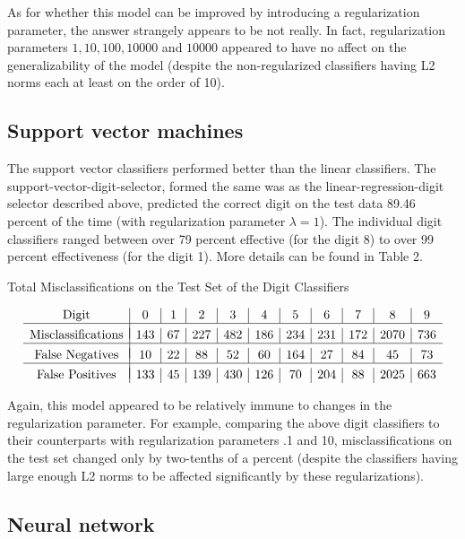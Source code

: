 \documentclass{article}
\begin{document}
As for whether this model can be improved by introducing a regularization parameter, the answer strangely appears to be not really. In fact, regularization parameters $1,10,100,10000$ and $10000$ appeared to have no affect on the generalizability of the model (despite the non-regularized classifiers having L2 norms each at least on the order of 10).

\subsection{Support vector machines}

The support vector classifiers performed better than the linear classifiers. The support-vector-digit-selector, formed the same was as the linear-regression-digit selector described above, predicted the correct digit on the test data 89.46 percent of the time (with regularization parameter $\lambda = 1$). The individual digit classifiers ranged between over 79 percent effective (for the digit 8) to over 99 percent effectiveness (for the digit 1). More details can be found in Table 2. \begin{table}
  \caption{Total Misclassifications on the Test Set of the Digit Classifiers}
  \label{sample-table}
  \centering
  $$\begin{array}{c|c|c|c|c|c|c|c|c|c|c} \mbox{Digit} & 0 & 1 & 2 & 3 &4 & 5 & 6 & 7 & 8 & 9  \\ \hline  \\[-.3cm]
\mbox{Misclassifications} & 143 & 67 & 227 & 482 & 186 & 234 & 231 & 172 & 2070 & 736  \\ \hline  \\[-.3cm]
\mbox{False Negatives} & 10 & 22 & 88 & 52 & 60 & 164 & 27 & 84 & 45 & 73  \\ \hline  \\[-.3cm]
\mbox{False Positives} & 133 & 45 & 139 & 430 & 126 & 70 & 204 & 88 & 2025 & 663 

\end{array}$$
\end{table}

Again, this model appeared to be relatively immune to changes in the regularization parameter. For example, comparing the above digit classifiers to their counterparts with regularization parameters .1 and 10, misclassifications on the test set changed only by two-tenths of a percent (despite the classifiers having large enough L2 norms to be affected significantly by these regularizations).

\subsection{Neural network} 
\end{document}
